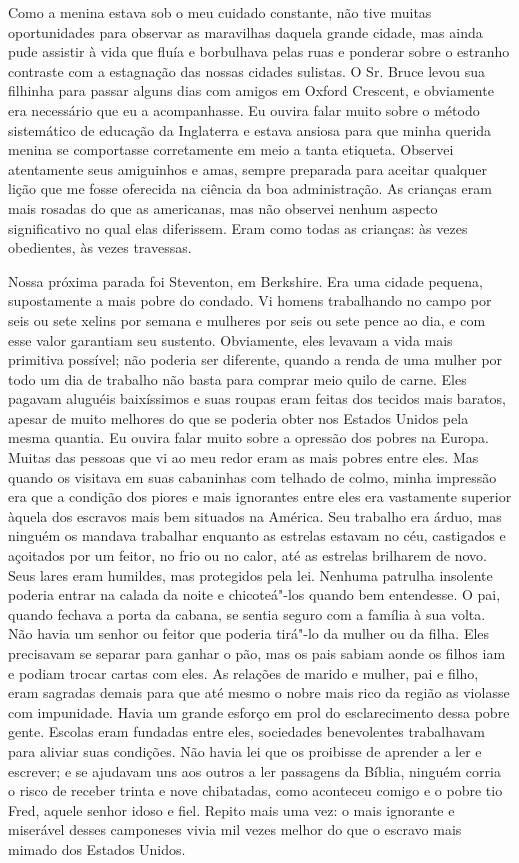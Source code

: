 Como a menina estava sob o meu cuidado
constante, não tive muitas oportunidades para observar as maravilhas
daquela grande cidade, mas ainda pude assistir à vida que fluía e
borbulhava pelas ruas e ponderar sobre o estranho contraste com a
estagnação das nossas cidades sulistas. O Sr. Bruce levou sua filhinha
para passar alguns dias com amigos em Oxford Crescent, e obviamente era
necessário que eu a acompanhasse. Eu ouvira falar muito sobre o método
sistemático de educação da Inglaterra e estava ansiosa para que minha
querida menina se comportasse corretamente em meio a tanta etiqueta.
Observei atentamente seus amiguinhos e amas, sempre preparada para
aceitar qualquer lição que me fosse oferecida na ciência da boa
administração. As crianças eram mais rosadas do que as americanas, mas
não observei nenhum aspecto significativo no qual elas diferissem. Eram
como todas as crianças: às vezes obedientes, às vezes travessas.

Nossa próxima parada foi Steventon, em
Berkshire. Era uma cidade pequena, supostamente a mais pobre do condado.
Vi homens trabalhando no campo por seis ou sete xelins por semana e
mulheres por seis ou sete pence ao dia, e com esse valor garantiam seu
sustento. Obviamente, eles levavam a vida mais primitiva possível; não
poderia ser diferente, quando a renda de uma mulher por todo um dia de
trabalho não basta para comprar meio quilo de carne. Eles pagavam
aluguéis baixíssimos e suas roupas eram feitas dos tecidos mais baratos,
apesar de muito melhores do que se poderia obter nos Estados Unidos pela
mesma quantia. Eu ouvira falar muito sobre a opressão dos pobres na
Europa. Muitas das pessoas que vi ao meu redor eram as mais pobres entre
eles. Mas quando os visitava em
suas cabaninhas com telhado de colmo, minha impressão era que a condição
dos piores e mais ignorantes entre eles era vastamente superior àquela
dos escravos mais bem situados na América. Seu trabalho era árduo, mas
ninguém os mandava trabalhar enquanto as estrelas estavam no céu,
castigados e açoitados por um feitor, no frio ou no calor, até as
estrelas brilharem de novo. Seus lares eram humildes, mas protegidos
pela lei. Nenhuma patrulha insolente poderia entrar na calada da noite e
chicoteá"-los quando bem entendesse. O pai, quando fechava a porta da
cabana, se sentia seguro com a família à sua volta. Não havia um senhor
ou feitor que poderia tirá"-lo da mulher ou da filha. Eles precisavam se
separar para ganhar o pão, mas os pais sabiam aonde os filhos iam e
podiam trocar cartas com eles. As relações de marido e mulher, pai e
filho, eram sagradas demais para que até mesmo o nobre mais rico da
região as violasse com impunidade. Havia um grande esforço em prol do
esclarecimento dessa pobre gente. Escolas eram fundadas entre eles,
sociedades benevolentes trabalhavam para aliviar suas condições. Não
havia lei que os proibisse de aprender a ler e escrever; e se ajudavam
uns aos outros a ler passagens da Bíblia, ninguém corria o risco de
receber trinta e nove chibatadas, como aconteceu comigo e o pobre tio
Fred, aquele senhor idoso e fiel.
Repito mais uma vez: o mais
ignorante e miserável desses camponeses vivia mil vezes melhor do que o
escravo mais mimado dos Estados Unidos.

